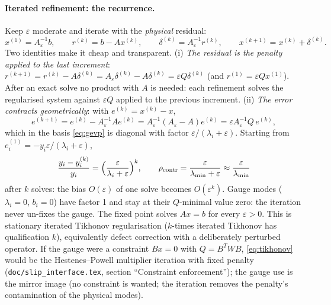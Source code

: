 \documentclass[11pt]{article}
\numberwithin{equation}{section}
\theoremstyle{remark}
\newcommand{\eps}{\varepsilon}
\newcommand{\code}[1]{\texttt{#1}}
\begin{document}
\paragraph{Iterated refinement: the recurrence.} Keep $\eps$ moderate and
iterate with the \emph{physical} residual:
\begin{equation}
  x^{(1)} = A_\eps^{-1}b, \qquad
  r^{(k)} = b - Ax^{(k)}, \qquad
  \delta^{(k)} = A_\eps^{-1}r^{(k)}, \qquad
  x^{(k+1)} = x^{(k)} + \delta^{(k)} .
  \label{eq:tikhonov}
\end{equation}
Two identities make it cheap and transparent.
(i) \emph{The residual is the penalty applied to the last increment}:
$r^{(k+1)} = r^{(k)} - A\delta^{(k)} = A_\eps\delta^{(k)} - A\delta^{(k)} =
\eps Q\delta^{(k)}$ (and $r^{(1)} = \eps Qx^{(1)}$). After an exact solve no
product with $A$ is needed: each refinement solves the regularised system
against $\eps Q$ applied to the previous increment.
(ii) \emph{The error contracts geometrically}: with $e^{(k)} = x^{(k)} - x$,
\begin{equation}
  e^{(k+1)} = e^{(k)} - A_\eps^{-1}Ae^{(k)}
            = A_\eps^{-1}(A_\eps - A)e^{(k)}
            = \eps A_\eps^{-1}Q\,e^{(k)},
\end{equation}
which in the basis \eqref{eq:gevp} is diagonal with factor
$\eps/(\lambda_i + \eps)$. Starting from $e^{(1)}_i = -y_i\eps/(\lambda_i +
\eps)$,
\begin{equation}
  \frac{y_i - y_i^{(k)}}{y_i} = \Bigl(\frac{\eps}{\lambda_i+\eps}\Bigr)^k,
  \qquad
  \rho_{\mathrm{contr}} = \frac{\eps}{\lambda_{\min}+\eps}\approx\frac{\eps}{\lambda_{\min}}
\end{equation}
after $k$ solves: the bias $O(\eps)$ of one solve becomes $O(\eps^k)$.
Gauge modes ($\lambda_i = 0$, $b_i = 0$) have factor 1 and stay at their
$Q$-minimal value zero: the iteration never un-fixes the gauge. The fixed
point solves $Ax = b$ for every $\eps > 0$. This is stationary iterated
Tikhonov regularisation \cite{Lardy1975,EnglHankeNeubauer} ($k$-times
iterated Tikhonov has qualification $k$), equivalently defect correction
with a deliberately perturbed operator. If the gauge were a constraint
$Bx = 0$ with $Q = B^TWB$, \eqref{eq:tikhonov} would be the Hestenes--Powell
multiplier iteration with fixed penalty
\cite{Hestenes1969,Powell1969,FortinGlowinski} (\code{doc/slip\_interface.tex},
section ``Constraint enforcement''); the gauge
use is the mirror image (no constraint is wanted; the iteration removes the
penalty's contamination of the physical modes).
\end{document}
